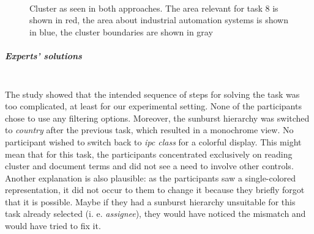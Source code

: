 \begin{figure}[!]
    \centering
    \\
    \caption{Cluster  as seen in both approaches. The area relevant for task 8 is shown in red, the area about industrial automation systems is shown in blue, the cluster boundaries are shown in gray}
    \label{fig:industrial_automation}
\end{figure}

\subparagraph{Experts' solutions}~\\
The study showed that the intended sequence of steps for solving the task was too complicated, at least for our experimental setting.
None of the participants chose to use any filtering options.
Moreover, the sunburst hierarchy was switched to \textit{country} after the previous task, which resulted in a monochrome view.
No participant wished to switch back to \textit{\gls{ipc} class} for a colorful display.
This might mean that for this task, the participants concentrated exclusively on reading cluster and document terms and did not see a need to involve other controls.
Another explanation is also plausible: as the participants saw a single-colored representation, it did not occur to them to change it because they briefly forgot that it is possible.
Maybe if they had a sunburst hierarchy unsuitable for this task already selected (i. e. \textit{assignee}), they would have noticed the mismatch and would have tried to fix it.

